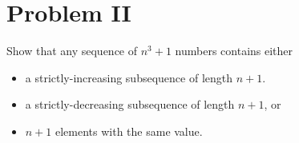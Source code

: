 \section{Problem II}
Show that any sequence of $n^3 + 1$ numbers contains either
\begin{itemize}
	\item a strictly-increasing subsequence of length $n + 1$.
	\item a strictly-decreasing subsequence of length $n + 1$, or
	\item $n + 1$ elements with the same value.
\end{itemize}
